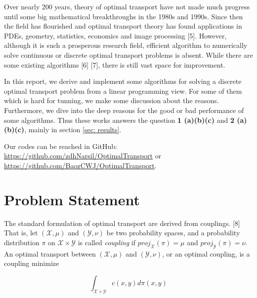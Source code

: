 \documentclass{article}
\begin{document}
\begin{large}
Over nearly 200 years, theory of optimal transport have not made much progress until some big mathematical breakthroughs in the 1980s and 1990s. Since then the field has flourished and optimal transport theory has found applications in PDEs, geometry, statistics, economics and image processing [5]. However, although it is such a prosperous research field, efficient algorithm to numerically solve continuous or discrete optimal transport problems is absent. While there are some existing algorithms [6] [7], there is still vast space for improvement.

In this report, we derive and implement some algorithms for solving a discrete optimal transport problem from a linear programming view. For some of them which is hard for tunning, we make some discussion about the reasons. Furthermore, we dive into the deep reasons for the good or bad performance of some algorithms. Thus these works answers the question \textbf{1 (a)(b)(c)} and \textbf{2 (a)(b)(c)}, mainly in section \ref{sec: results}. 

Our codes can be reached in GitHub: \href{https://github.com/zdhNarsil/OptimalTransport}{https://github.com/zdhNarsil/OptimalTransport} or \href{https://github.com/BaozCWJ/OptimalTransport}{https://github.com/BaozCWJ/OptimalTransport}. 

\section{Problem Statement}
The standard formulation of optimal transport are derived from couplings. [8] That is, let $ \left(\mathcal{X}, \mu \right)$ and $\left(\mathcal{Y}, \nu \right)$  be two probability spaces, and a probability distribution $\pi$ on $ \mathcal{X} \times \mathcal{Y} $ is called \emph{coupling} if $ proj_{\mathcal{X}} (\pi) = \mu $ and $ proj_{\mathcal{Y}} (\pi)= \nu $. An optimal transport between $ \left(\mathcal{X}, \mu \right)  $ and $ \left(\mathcal{Y}, \nu \right) $, or an optimal coupling, is a coupling minimize

\begin{equation}
\int_{ \mathcal{X} \times \mathcal{Y} } c ( x, y)  d \pi ( x, y ) 
\label{def}
\end{equation}


\end{large}
\end{document}
